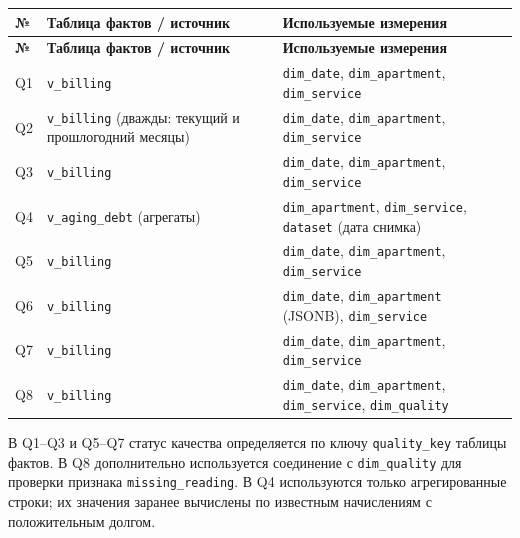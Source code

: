 \documentclass[12pt]{article}
\begin{document}
\begingroup
\small
\renewcommand{\arraystretch}{1.22}
\begin{longtable}{|>{\raggedright\arraybackslash}p{0.8cm}|>{\raggedright\arraybackslash}p{4.2cm}|>{\raggedright\arraybackslash}p{8.2cm}|}
\hline
\textbf{№} & \textbf{Таблица фактов / источник} & \textbf{Используемые измерения} \\
\hline
\endfirsthead
\hline
\textbf{№} & \textbf{Таблица фактов / источник} & \textbf{Используемые измерения} \\
\hline
\endhead
Q1 & \texttt{v\_billing} & \texttt{dim\_date}, \texttt{dim\_apartment}, \texttt{dim\_service} \\
\hline
Q2 & \texttt{v\_billing} (дважды: текущий и прошлогодний месяцы) & \texttt{dim\_date}, \texttt{dim\_apartment}, \texttt{dim\_service} \\
\hline
Q3 & \texttt{v\_billing} & \texttt{dim\_date}, \texttt{dim\_apartment}, \texttt{dim\_service} \\
\hline
Q4 & \texttt{v\_aging\_debt} (агрегаты) & \texttt{dim\_apartment}, \texttt{dim\_service}, \texttt{dataset} (дата снимка) \\
\hline
Q5 & \texttt{v\_billing} & \texttt{dim\_date}, \texttt{dim\_apartment}, \texttt{dim\_service} \\
\hline
Q6 & \texttt{v\_billing} & \texttt{dim\_date}, \texttt{dim\_apartment} (JSONB), \texttt{dim\_service} \\
\hline
Q7 & \texttt{v\_billing} & \texttt{dim\_date}, \texttt{dim\_apartment}, \texttt{dim\_service} \\
\hline
Q8 & \texttt{v\_billing} & \texttt{dim\_date}, \texttt{dim\_apartment}, \texttt{dim\_service}, \texttt{dim\_quality} \\
\hline
\end{longtable}
\endgroup

В Q1--Q3 и Q5--Q7 статус качества определяется по ключу \texttt{quality\_key} таблицы фактов. В Q8 дополнительно используется соединение с \texttt{dim\_quality} для проверки признака \texttt{missing\_reading}. 
В Q4 используются только агрегированные строки; их значения заранее вычислены по известным начислениям с положительным долгом.
\end{document}
